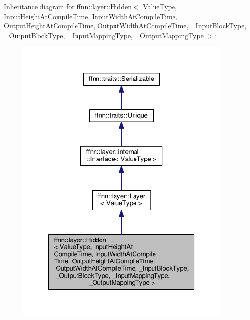 Inheritance diagram for ffnn\-:\-:layer\-:\-:Hidden$<$ Value\-Type, Input\-Height\-At\-Compile\-Time, Input\-Width\-At\-Compile\-Time, Output\-Height\-At\-Compile\-Time, Output\-Width\-At\-Compile\-Time, \-\_\-\-Input\-Block\-Type, \-\_\-\-Output\-Block\-Type, \-\_\-\-Input\-Mapping\-Type, \-\_\-\-Output\-Mapping\-Type $>$\-:
\nopagebreak
\begin{figure}[H]
\begin{center}
\leavevmode
\includegraphics[width=302pt]{classffnn_1_1layer_1_1_hidden__inherit__graph}
\end{center}
\end{figure}


